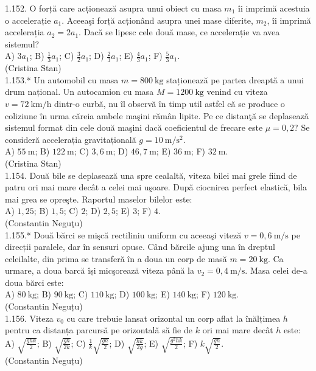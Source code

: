 1.152. O forță care acționează asupra unui obiect cu masa $m_{1}$ îi imprimă acestuia o accelerație $a_{1}$. Aceeaşi forță acționând asupra unei mase diferite, $m_{2}$, îi imprimă accelerația $a_{2}=2 a_{1}$. Dacă se lipesc cele două mase, ce accelerație va avea sistemul?\\ A) $3 a_{1}$; B) $\frac{1}{3} a_{1}$; C) $\frac{3}{2} a_{1}$; D) $\frac{2}{3} a_{1}$; E) $\frac{4}{3} a_{1}$; F) $\frac{5}{3} a_{1}$.\\ (Cristina Stan)\\

1.153.* Un automobil cu masa $m=800 \mathrm{~kg}$ staționează pe partea dreaptă a unui drum național. Un autocamion cu masa $M=1200 \mathrm{~kg}$ venind cu viteza $v=72 \mathrm{~km} / \mathrm{h}$ dintr-o curbă, nu îl observă în timp util astfel că se produce o coliziune în urma căreia ambele maşini rămân lipite. Pe ce distanţă se deplasează sistemul format din cele două maşini dacă coeficientul de frecare este $\mu=0,2$? Se consideră accelerația gravitațională $g=10 \mathrm{~m} / \mathrm{s}^{2}$.\\ A) $55 \mathrm{~m}$; B) $122 \mathrm{~m}$; C) $3,6 \mathrm{~m}$; D) $46,7 \mathrm{~m}$; E) $36 \mathrm{~m}$; F) $32 \mathrm{~m}$.\\ (Cristina Stan)\\

1.154. Două bile se deplasează una spre cealaltă, viteza bilei mai grele fiind de patru ori mai mare decât a celei mai uşoare. După ciocnirea perfect elastică, bila mai grea se opreşte. Raportul maselor bilelor este:\\ A) $1,25$; B) $1,5$; C) $2$; D) $2,5$; E) $3$; F) $4$.\\ (Constantin Neguţu)\\

1.155.* Două bărci se mişcă rectiliniu uniform cu aceeaşi viteză $v=0,6 \mathrm{~m} / \mathrm{s}$ pe direcții paralele, dar în sensuri opuse. Când bărcile ajung una în dreptul celeilalte, din prima se transferă în a doua un corp de masă $m=20 \mathrm{~kg}$. Ca urmare, a doua barcă își micşorează viteza până la $v_{2}=0,4 \mathrm{~m} / \mathrm{s}$. Masa celei de-a doua bărci este:\\ A) $80 \mathrm{~kg}$; B) $90 \mathrm{~kg}$; C) $110 \mathrm{~kg}$; D) $100 \mathrm{~kg}$; E) $140 \mathrm{~kg}$; F) $120 \mathrm{~kg}$.\\ (Constantin Neguțu)\\

1.156. Viteza $v_{0}$ cu care trebuie lansat orizontal un corp aflat la înălțimea $h$ pentru ca distanța parcursă pe orizontală să fie de $k$ ori mai mare decât $h$ este:\\ A) $\sqrt{\frac{g h k}{2}}$; B) $\sqrt{\frac{g h}{2 k}}$; C) $\frac{1}{k} \sqrt{\frac{g h}{2}}$; D) $\sqrt{\frac{h k}{2 g}}$; E) $\sqrt{\frac{g^{2} h k}{2}}$; F) $k \sqrt{\frac{g h}{2}}$.\\ (Constantin Neguțu)\\

